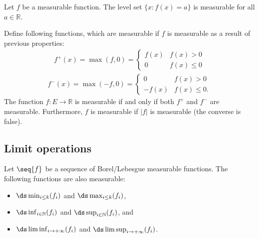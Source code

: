     \begin{property}
        Let $f$ be a measurable function. The level set $\{x:f(x) = a\}$ is measurable for all $a\in\mathbb{R}$.
    \end{property}

    \begin{property}
        Define following functions, which are measurable if $f$ is measurable as a result of previous properties:
        \begin{gather}
            \label{lebesgue:positive_part}
            f^+(x) = \max(f,0) =
            \begin{cases}
                f(x)&f(x)>0\\
                0&f(x)\leq0
            \end{cases}
        \end{gather}
        \begin{gather}
            \label{lebesgue:negative_part}
            f^-(x) = \max(-f,0) =
            \begin{cases}
                0&f(x)>0\\
                -f(x)&f(x)\leq0.
            \end{cases}
        \end{gather}
        The function $f:E\rightarrow\mathbb{R}$ is measurable if and only if both $f^+$ and $f^-$ are measurable. Furthermore, $f$ is measurable if $|f|$ is measurable (the converse is false).
    \end{property}

\subsection{Limit operations}

    \begin{property}
        Let $\seq{f}$ be a sequence of Borel/Lebesgue measurable functions. The following functions are also measurable:
        \begin{itemize}
            \item $\ds\min_{i\leq k}(f_i)$ and $\ds\max_{i\leq k}(f_i)$,
            \item $\ds\inf_{i\in\mathbb{N}}(f_i)$ and $\ds\sup_{i\in\mathbb{N}}(f_i)$, and
            \item $\ds\liminf_{i\rightarrow+\infty}(f_i)$ and $\ds\limsup_{i\rightarrow+\infty}(f_i)$.
        \end{itemize}
    \end{property}

